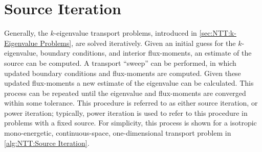 {  \section{Source Iteration}{\label{sec:NTT:Source Iteration}
    Generally, the $k$-eigenvalue transport problems, introduced in \cref{sec:NTT:k-Eigenvalue Problems}, are solved iteratively.
    Given an initial guess for the $k$-eigenvalue, boundary conditions, and interior flux-moments, an estimate of the source can be computed.
    A transport ``sweep'' can be performed, in which updated boundary conditions and flux-moments are computed.
    Given these updated flux-moments a new estimate of the eigenvalue can be calculated.
    This process can be repeated until the eigenvalue and flux-moments are converged within some tolerance.
    This procedure is referred to as either source iteration, or power iteration; typically, power iteration is used to refer to this procedure in problems with a fixed source.
    For simplicity, this process is shown for a isotropic mono-energetic, continuous-space, one-dimensional transport problem in \cref{alg:NTT:Source Iteration}.

}}

